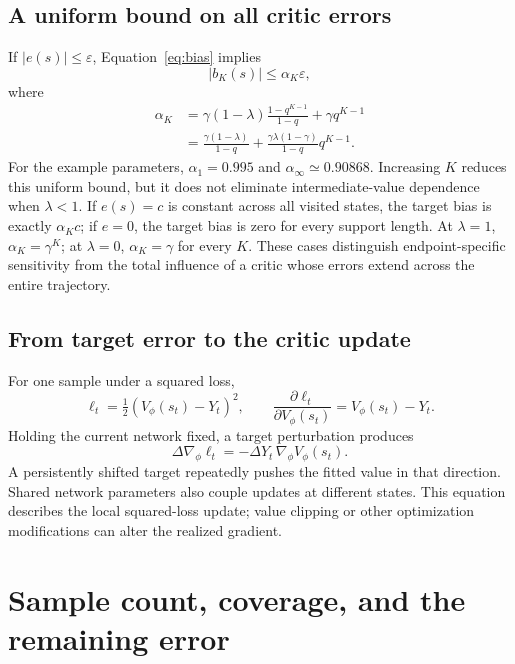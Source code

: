 \documentclass[11pt,a4paper]{article}
\numberwithin{equation}{section}
\begin{document}
\subsection{A uniform bound on all critic errors}
If $|e(s)|\le\varepsilon$, Equation~\eqref{eq:bias} implies
\begin{equation}
 |b_K(s)|\le\alpha_K\varepsilon,
\end{equation}
where
\begin{align}\label{eq:alpha}
 \alpha_K
 &=\gamma(1-\lambda)\frac{1-q^{K-1}}{1-q}+\gamma q^{K-1}\nonumber\\
 &=\frac{\gamma(1-\lambda)}{1-q}
 +\frac{\gamma\lambda(1-\gamma)}{1-q}q^{K-1}.
\end{align}
For the example parameters, $\alpha_1=0.995$ and
$\alpha_\infty\simeq0.90868$. Increasing $K$ reduces this uniform bound, but it does
not eliminate intermediate-value dependence when $\lambda<1$.
If $e(s)=c$ is constant across all visited states, the target bias is exactly
$\alpha_Kc$; if $e=0$, the target bias is zero for every support length.
At $\lambda=1$, $\alpha_K=\gamma^K$; at $\lambda=0$, $\alpha_K=\gamma$ for every $K$.
These cases distinguish endpoint-specific sensitivity from the total influence
of a critic whose errors extend across the entire trajectory.

\subsection{From target error to the critic update}
For one sample under a squared loss,
\begin{equation}
 \ell_t=\tfrac12(V_\phi(s_t)-Y_t)^2,\qquad
 \frac{\partial\ell_t}{\partial V_\phi(s_t)}=V_\phi(s_t)-Y_t.
\end{equation}
Holding the current network fixed, a target perturbation produces
\begin{equation}
 \Delta\nabla_\phi\ell_t=-\Delta Y_t\,\nabla_\phi V_\phi(s_t).
\end{equation}
A persistently shifted target repeatedly pushes the fitted value in that direction.
Shared network parameters also couple updates at different states. This equation
describes the local squared-loss update; value clipping or other optimization
modifications can alter the realized gradient.

\section{Sample count, coverage, and the remaining error}
\end{document}
